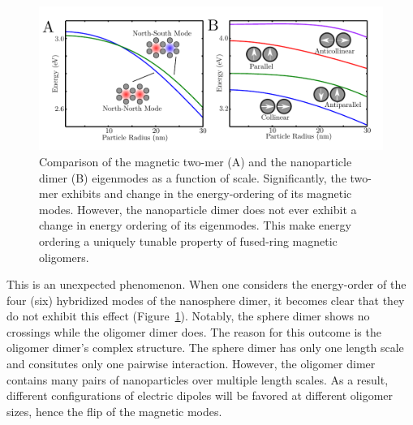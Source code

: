 \documentclass[journal=apchd5,manuscript=article]{achemso}
\begin{document}
\begin{figure}
\begin{center}
\includegraphics{twomer_dimer.pdf}
\caption{Comparison of the magnetic two-mer (A) and the nanoparticle dimer (B) eigenmodes as a function of scale. Significantly, the two-mer exhibits and change in the energy-ordering of its magnetic modes. However, the nanoparticle dimer does not ever exhibit a change in energy ordering of its eigenmodes. This make energy ordering a uniquely tunable property of fused-ring magnetic oligomers.}
\label{twomer_dimer}
\end{center}
\end{figure}

This is an unexpected phenomenon. When one considers the energy-order of the four (six) hybridized modes of the nanosphere dimer, it becomes clear that they do not exhibit this effect (Figure~\ref{twomer_dimer}). Notably, the sphere dimer shows no crossings while the oligomer dimer does. The reason for this outcome is the oligomer dimer's complex structure\cite{Cherqui2016}. The sphere dimer has only one length scale and consitutes only one pairwise interaction. However, the oligomer dimer contains many pairs of nanoparticles over multiple length scales. As a result, different configurations of electric dipoles will be favored at different oligomer sizes, hence the flip of the magnetic modes.
\end{document}
